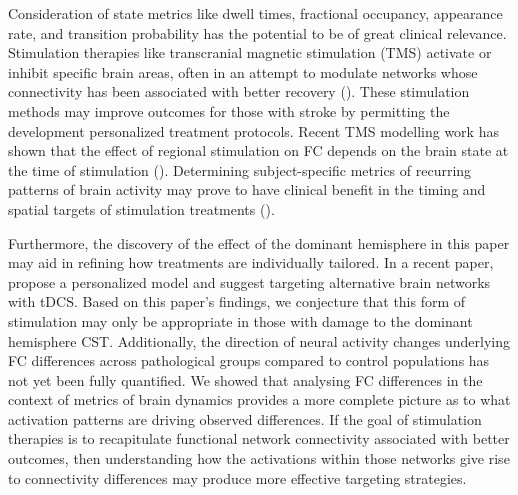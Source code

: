 \documentclass[phd,tocprelim]{cornell}
\begin{document}
    Consideration of state metrics like dwell times, fractional occupancy, appearance rate, and transition probability has the potential to be of great clinical relevance. Stimulation therapies like transcranial magnetic stimulation (TMS) activate or inhibit specific brain areas, often in an attempt to modulate networks whose connectivity has been associated with better recovery (\cite{Fisicaro2019-ly, Grefkes2010-jg, Fox2012-xz}). These stimulation methods may improve outcomes for those with stroke by permitting the development personalized treatment protocols. Recent TMS modelling work has shown that the effect of regional stimulation on FC depends on the brain state at the time of stimulation (\cite{Silvanto2008-um, Edwards2020-mr, Bergmann2018-re}). Determining subject-specific metrics of recurring patterns of brain activity may prove to have clinical benefit in the timing and spatial targets of stimulation treatments (\cite{Scangos2021-vy}).
    
    Furthermore, the discovery of the effect of the dominant hemisphere in this paper may aid in refining how treatments are individually tailored. In a recent paper, \cite{Hordacre2021-iu} propose a personalized model and suggest targeting alternative brain networks with tDCS. Based on this paper's findings, we conjecture that this form of stimulation may only be appropriate in those with damage to the dominant hemisphere CST. Additionally, the direction of neural activity changes underlying FC differences across pathological groups compared to control populations has not yet been fully quantified. We showed that analysing FC differences in the context of metrics of brain dynamics provides a more complete picture as to what activation patterns are driving observed differences. If the goal of stimulation therapies is to recapitulate functional network connectivity associated with better outcomes, then understanding how the activations within those networks give rise to connectivity differences may produce more effective targeting strategies.
    
\end{document}
